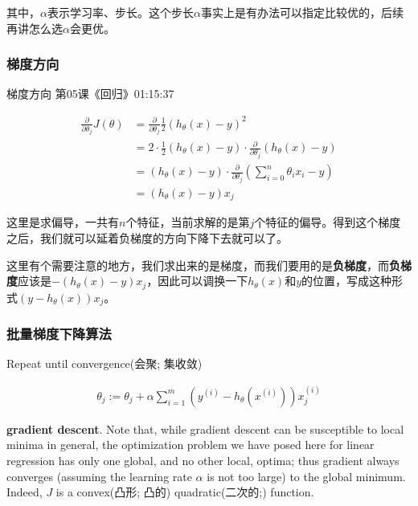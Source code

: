 \documentclass[UTF8]{ctexart}
\begin{document}
其中，$\alpha$表示学习率、步长。这个步长$\alpha$事实上是有办法可以指定比较优的，后续再讲怎么选$\alpha$会更优。

\subsubsection{梯度方向}
梯度方向 第05课《回归》01:15:37

\begin{equation}
\begin{aligned}
\frac{\partial}{\partial \theta_{j}} J(\theta)&=\frac{\partial}{\partial \theta_{j}} \frac{1}{2} (h_{\theta}(x)-y)^{2}\\
&=2 \cdot \frac{1}{2} (h_{\theta}(x)-y) \cdot \frac{\partial}{\partial \theta_{j}}(h_{\theta}(x)-y)\\
&=(h_{\theta}(x)-y) \cdot \frac{\partial}{\partial \theta_{j}}(\sum_{i=0}^{n}\theta_{i}x_{i}-y)\\
&=(h_{\theta}(x)-y)x_{j}
\end{aligned}
\end{equation}

这里是求偏导，一共有$n$个特征，当前求解的是第$j$个特征的偏导。得到这个梯度之后，我们就可以延着负梯度的方向下降下去就可以了。

这里有个需要注意的地方，我们求出来的是梯度，而我们要用的是\textbf{负梯度}，而\textbf{负梯度}应该是$-(h_{\theta}(x)-y)x_{j}$，因此可以调换一下$h_{\theta}(x)$和$y$的位置，写成这种形式$(y-h_{\theta}(x))x_{j}$。

\subsubsection{批量梯度下降算法}

Repeat until convergence(会聚; 集收敛)

\begin{equation}
\begin{aligned}
\theta_{j} := \theta_{j}+\alpha \sum_{i=1}^{m} (y^{(i)}-h_{\theta}(x^{(i)}))x^{(i)}_{j}
\end{aligned}
\end{equation}

\textbf{gradient descent}. Note that, while gradient descent can be susceptible to local minima in general, the optimization problem we have posed here for linear regression has only one global, and no other local, optima; thus gradient always converges (assuming the learning rate $\alpha$ is not too large) to the global minimum. Indeed, $J$ is a convex(凸形; 凸的) quadratic(二次的;) function.
\end{document}
